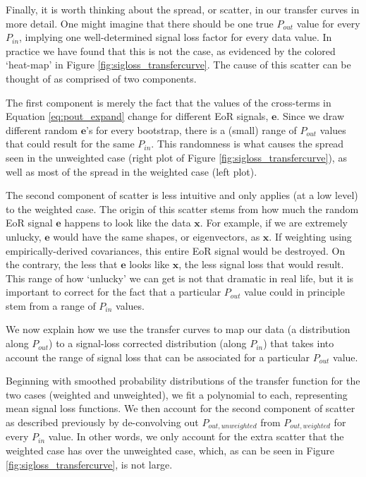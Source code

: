 \documentclass[preprint2,numberedappendix,tighten]{aastex6}  %
\begin{document}
Finally, it is worth thinking about the spread, or scatter, in our transfer curves in more detail. One might imagine that there should be one true $P_{out}$ value for every $P_{in}$, implying one well-determined signal loss factor for every data value. In practice we have found that this is not the case, as evidenced by the colored `heat-map' in Figure \ref{fig:sigloss_transfercurve}. The cause of this scatter can be thought of as comprised of two components. 

The first component is merely the fact that the values of the cross-terms in Equation \ref{eq:pout_expand} change for different EoR signals, $\textbf{e}$. Since we draw different random $\textbf{e}$'s for every bootstrap, there is a (small) range of $P_{out}$ values that could result for the same $P_{in}$. This randomness is what causes the spread seen in the unweighted case (right plot of Figure \ref{fig:sigloss_transfercurve}), as well as most of the spread in the weighted case (left plot).

The second component of scatter is less intuitive and only applies (at a low level) to the weighted case. The origin of this scatter stems from how much the random EoR signal $\textbf{e}$ happens to look like the data $\textbf{x}$. For example, if we are extremely unlucky, $\textbf{e}$ would have the same shapes, or eigenvectors, as $\textbf{x}$. If weighting using empirically-derived covariances, this entire EoR signal would be destroyed. On the contrary, the less that $\textbf{e}$ looks like $\textbf{x}$, the less signal loss that would result. This range of how `unlucky' we can get is not that dramatic in real life, but it is important to correct for the fact that a particular $P_{out}$ value could in principle stem from a range of $P_{in}$ values. 

We now explain how we use the transfer curves to map our data (a distribution along $P_{out}$) to a signal-loss corrected distribution (along $P_{in}$) that takes into account the range of signal loss that can be associated for a particular $P_{out}$ value.

Beginning with smoothed probability distributions of the transfer function for the two cases (weighted and unweighted), we fit a polynomial to each, representing mean signal loss functions. We then account for the second component of scatter as described previously by de-convolving out $P_{out, unweighted}$ from $P_{out, weighted}$ for every $P_{in}$ value. In other words, we only account for the extra scatter that the weighted case has over the unweighted case, which, as can be seen in Figure \ref{fig:sigloss_transfercurve}, is not large.
\end{document}
